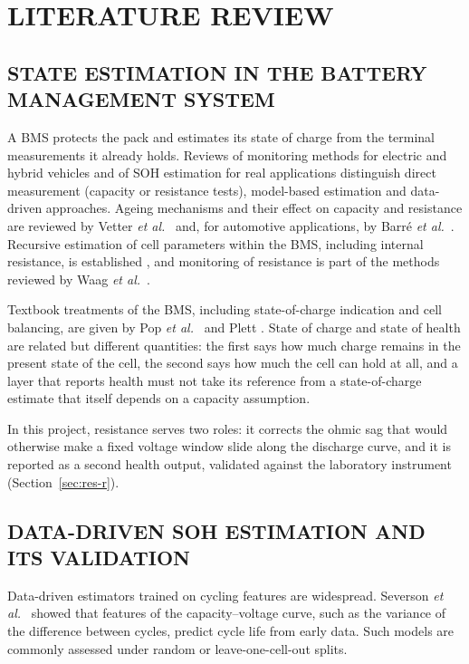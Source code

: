 \chapter{LITERATURE REVIEW}
\label{ch:lit}

\section{STATE ESTIMATION IN THE BATTERY MANAGEMENT SYSTEM}

A BMS protects the pack and estimates its state of charge from the terminal measurements it already holds. Reviews of monitoring methods for electric and hybrid vehicles \cite{waag2014} and of SOH estimation for real applications \cite{berecibar2016} distinguish direct measurement (capacity or resistance tests), model-based estimation and data-driven approaches. Ageing mechanisms and their effect on capacity and resistance are reviewed by Vetter \emph{et al.}\ \cite{vetter2005} and, for automotive applications, by Barr\'e \emph{et al.}\ \cite{barre2013}. Recursive estimation of cell parameters within the BMS, including internal resistance, is established \cite{plett2004}, and monitoring of resistance is part of the methods reviewed by Waag \emph{et al.}\ \cite{waag2014}.

Textbook treatments of the BMS, including state-of-charge indication and cell balancing, are given by Pop \emph{et al.}\ \cite{pop2008} and Plett \cite{plett2015}. State of charge and state of health are related but different quantities: the first says how much charge remains in the present state of the cell, the second says how much the cell can hold at all, and a layer that reports health must not take its reference from a state-of-charge estimate that itself depends on a capacity assumption.

In this project, resistance serves two roles: it corrects the ohmic sag that would otherwise make a fixed voltage window slide along the discharge curve, and it is reported as a second health output, validated against the laboratory instrument (Section~\ref{sec:res-r}).

\section{DATA-DRIVEN SOH ESTIMATION AND ITS VALIDATION}

Data-driven estimators trained on cycling features are widespread. Severson \emph{et al.}\ \cite{severson2019} showed that features of the capacity--voltage curve, such as the variance of the difference between cycles, predict cycle life from early data. Such models are commonly assessed under random or leave-one-cell-out splits.

